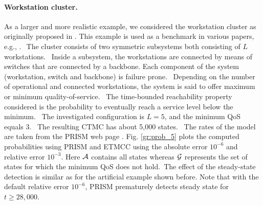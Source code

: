 \documentclass{entcs}
\begin{document}
	\paragraph{Workstation cluster. \label{ss:work_clust}}
		As a larger and more realistic example, we considered the workstation cluster as originally proposed in \cite{HaverkortHK_SRDS00}. This example is used as a benchmark in various papers, e.g., \cite{BuchholzKKT_JLAP03,YounesKNP_TACAS04,KwiatkowskaNP_IMTTCPE02,Prism_WC05}.$\:$ The cluster consists of two symmetric subsystems both consisting of $L$ workstations.  Inside a subsystem, the workstations are connected by means of switches that are connected by a backbone. Each component of the system (workstation, switch and backbone) is failure prone.  Depending on the number of operational and connected workstations, the system is said to offer maximum or minimum quality-of-service.  The time-bounded reachability property considered is the probability to eventually reach a service level below the minimum.  The investigated configuration is $L{=}5$, and the minimum QoS equals 3.  The resulting CTMC has about 5,000 states.  The rates of the model are taken from the PRISM web page \cite{Prism_WC05}. Fig. \ref{gr:prob_5} plots the computed probabilities using PRISM and ETMCC using the absolute error $10^{{-}6}$ and relative error $10^{{-}3}$. Here $\mathcal{A}$ contains all states whereas $\mathcal{G}$ represents the set of states for which the minimum QoS does not hold. The effect of the steady-state detection is similar as for the artificial example shown before.
		Note that with the default relative error $10^{{-}6}$, PRISM prematurely detects steady state for $t \geq 28,000$.
\end{document}
